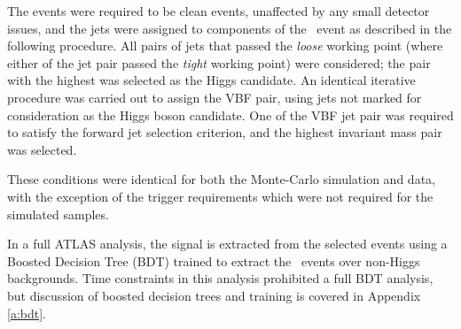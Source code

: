 		The events were required to be clean events, unaffected by any small detector issues, and the jets were assigned to components of the \VBFHBB\, event as described in the following procedure. All pairs of jets that passed the \textit{loose} working point (where either of the jet pair passed the \textit{tight} working point) were considered; the pair with the highest \ptbb was selected as the Higgs candidate. An identical iterative procedure was carried out to assign the VBF pair, using jets not marked for consideration as the Higgs boson candidate. One of the VBF jet pair was required to satisfy the forward jet selection criterion, and the highest invariant mass pair was selected.

		These conditions were identical for both the Monte-Carlo simulation and data, with the exception of the trigger requirements which were not required for the simulated samples.

		In a full ATLAS analysis\cite{VBFHbb8tev}, the signal is extracted from the selected events using a Boosted Decision Tree (BDT) trained to extract the \VBFHBB\, events over non-Higgs backgrounds. Time constraints in this analysis prohibited a full BDT analysis, but discussion of boosted decision trees and training is covered in Appendix \ref{a:bdt}.


\endinput
